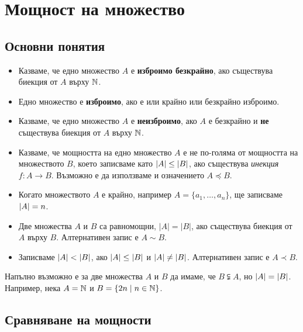 \chapter{Мощност на множество}

\section{Основни понятия}

\begin{itemize}
\item 
  Казваме, че едно множество $A$ е {\bf изброимо безкрайно}, ако съществува 
  биекция от $A$ върху $\mathbb{N}$.
\item
  Едно множество е {\bf изброимо}, ако е или крайно или безкрайно изброимо.
\item
  Казваме, че едно множество $A$ е {\bf неизброимо}, ако $A$ е безкрайно и {\bf не} съществува 
  биекция от $A$ върху $\mathbb{N}$.
\item
  Казваме, че мощността на едно множество $A$ е не по-голяма от мощността на множеството $B$, 
  което записваме като $\lvert{A}\rvert \leq \lvert{B}\rvert$, ако съществува {\em инекция} $f:A \to B$.
  Възможно е да използваме и означението $A \preceq B$.
\item
  Когато множеството $A$ е крайно, например $A = \{a_1,\dots,a_n\}$, 
  ще записваме $\lvert{A}\rvert = n$.
\item
  Две множества $A$ и $B$ са равномощни, $|A| = |B|$, ако съществува биекция от $A$ върху $B$.
  Алтернативен запис е $A \sim B$.
\item
  Записваме $\lvert{A}\rvert < \lvert{B}\rvert$, ако $\lvert{A}\rvert \leq \lvert{B}\rvert$ и $\lvert{A}\rvert \neq \lvert{B}\rvert$.
  Алтернативен запис е $A \prec B$.
\end{itemize}

\begin{framed}
\begin{remark}
  Напълно възможно е за две множества $A$ и $B$ да имаме, че  $B \subsetneqq A$, но $\lvert{A}\rvert = \lvert{B}\rvert$.
  Например, нека $A = \mathbb{N}$ и $B = \{2n\mid n\in\mathbb{N}\}$.
\end{remark}
\end{framed}

\section{Сравняване на мощности}

